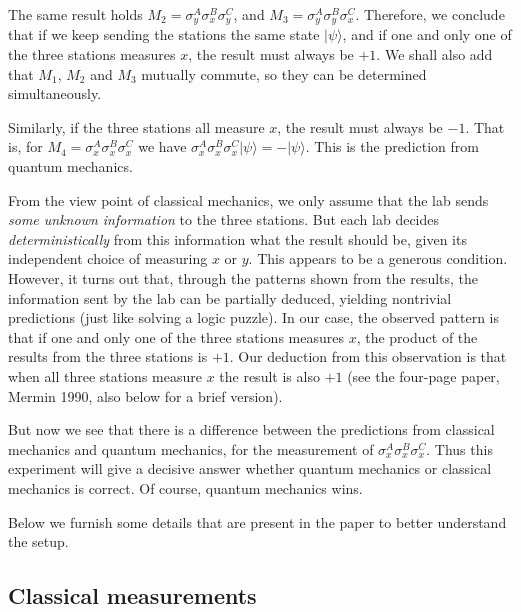 \documentclass{article}
\begin{document}
The same result holds $M_2 = \sigma^A_y \sigma^B_x \sigma^C_y$,
and $M_3 = \sigma^A_y \sigma^B_y \sigma^C_x$.
Therefore, we conclude that
if we keep sending the stations the same state $|\psi\rangle$,
and if one and only one of the three stations measures $x$,
the result must always be $+1$.
%
We shall also add that $M_1$, $M_2$ and $M_3$ mutually commute,
so they can be determined simultaneously.


Similarly,
if the three stations all measure $x$,
the result must always be $-1$.
That is, for $M_4 = \sigma^A_x \sigma^B_x \sigma^C_x$
we have $\sigma^A_x \sigma^B_x \sigma^C_x|\psi\rangle = -|\psi\rangle$.
This is the prediction from quantum mechanics.


From the view point of classical mechanics,
we only assume that the lab sends \emph{some unknown information}
to the three stations.
But each lab decides \emph{deterministically} from this information
what the result should be, given its independent choice of measuring $x$ or $y$.
%
This appears to be a generous condition.
However, it turns out that,
through the patterns shown from the results,
the information sent by the lab can be partially deduced,
yielding nontrivial predictions (just like solving a logic puzzle).
In our case, the observed pattern is that
if one and only one of the three stations measures $x$,
the product of the results from the three stations is $+1$.
Our deduction from this observation is
that when all three stations measure $x$
the result is also $+1$
(see the four-page paper, Mermin 1990, also below for a brief version).

But now we see that there is a difference between
the predictions from classical mechanics and quantum mechanics,
for the measurement of $\sigma^A_x \sigma^B_x \sigma^C_x$.
Thus this experiment will give a decisive answer
whether quantum mechanics or classical mechanics is correct.
Of course, quantum mechanics wins.


Below we furnish some details that are present in the paper
to better understand the setup.


\subsection{Classical measurements}
\end{document}
